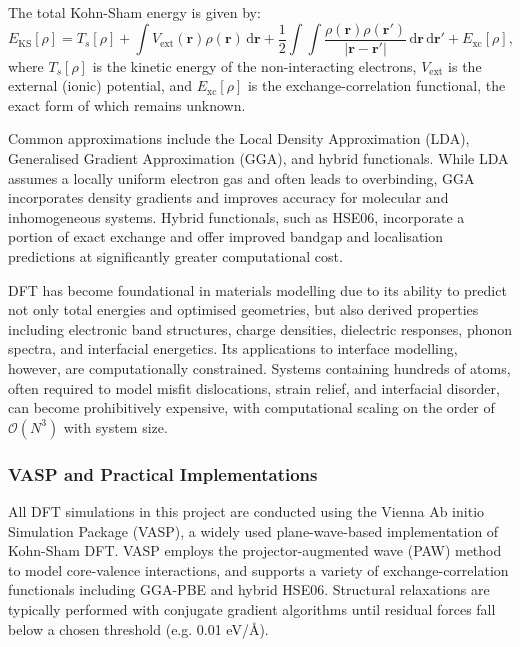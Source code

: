 The total Kohn-Sham energy is given by: \begin{equation} E_{\mathrm{KS}}[\rho] = T_s[\rho] + \int V_{\mathrm{ext}}(\mathbf{r}) \rho(\mathbf{r}) \, \mathrm{d}\mathbf{r} + \frac{1}{2} \int \int \frac{\rho(\mathbf{r}) \rho(\mathbf{r'})}{|\mathbf{r} - \mathbf{r'}|} \, \mathrm{d}\mathbf{r} \, \mathrm{d}\mathbf{r'} + E_{\mathrm{xc}}[\rho], \end{equation} where $T_s[\rho]$ is the kinetic energy of the non-interacting electrons, $V_{\mathrm{ext}}$ is the external (ionic) potential, and $E_{\mathrm{xc}}[\rho]$ is the exchange-correlation functional, the exact form of which remains unknown. 
 
Common approximations include the Local Density Approximation (LDA), Generalised Gradient Approximation (GGA), and hybrid functionals. While LDA assumes a locally uniform electron gas and often leads to overbinding, GGA incorporates density gradients and improves accuracy for molecular and inhomogeneous systems. Hybrid functionals, such as HSE06, incorporate a portion of exact exchange and offer improved bandgap and localisation predictions at significantly greater computational cost. 
 
DFT has become foundational in materials modelling due to its ability to predict not only total energies and optimised geometries, but also derived properties including electronic band structures, charge densities, dielectric responses, phonon spectra, and interfacial energetics. Its applications to interface modelling, however, are computationally constrained. Systems containing hundreds of atoms, often required to model misfit dislocations, strain relief, and interfacial disorder, can become prohibitively expensive, with computational scaling on the order of $\mathcal{O}(N^3)$ with system size. 
 
\subsubsection{VASP and Practical Implementations} 
 
All DFT simulations in this project are conducted using the Vienna Ab initio Simulation Package (VASP), a widely used plane-wave-based implementation of Kohn-Sham DFT. VASP employs the projector-augmented wave (PAW) method to model core-valence interactions, and supports a variety of exchange-correlation functionals including GGA-PBE and hybrid HSE06. Structural relaxations are typically performed with conjugate gradient algorithms until residual forces fall below a chosen threshold (e.g. 0.01 eV/\AA). 
 
